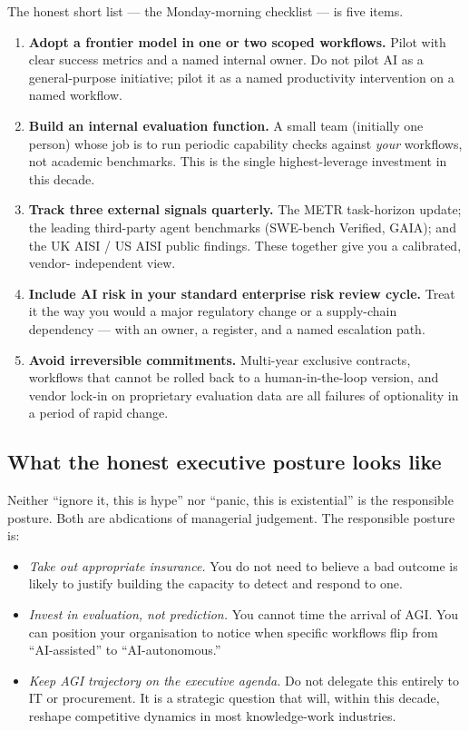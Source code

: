 \documentclass[11pt,a4paper]{article}
\begin{document}
The honest short list --- the Monday-morning checklist --- is five
items.

\begin{enumerate}[leftmargin=1.4em]
  \item \textbf{Adopt a frontier model in one or two scoped workflows.}
        Pilot with clear success metrics and a named internal owner.
        Do not pilot AI as a general-purpose initiative; pilot it as
        a named productivity intervention on a named workflow.
  \item \textbf{Build an internal evaluation function.} A small team
        (initially one person) whose job is to run periodic capability
        checks against \emph{your} workflows, not academic benchmarks.
        This is the single highest-leverage investment in this
        decade.
  \item \textbf{Track three external signals quarterly.} The METR
        task-horizon update; the leading third-party agent benchmarks
        (SWE-bench Verified, GAIA); and the UK AISI / US AISI public
        findings. These together give you a calibrated, vendor-
        independent view.
  \item \textbf{Include AI risk in your standard enterprise risk
        review cycle.} Treat it the way you would a major regulatory
        change or a supply-chain dependency --- with an owner, a
        register, and a named escalation path.
  \item \textbf{Avoid irreversible commitments.} Multi-year exclusive
        contracts, workflows that cannot be rolled back to a
        human-in-the-loop version, and vendor lock-in on proprietary
        evaluation data are all failures of optionality in a period of
        rapid change.
\end{enumerate}

\subsection{What the honest executive posture looks like}

Neither ``ignore it, this is hype'' nor ``panic, this is existential''
is the responsible posture. Both are abdications of managerial
judgement. The responsible posture is:

\begin{itemize}[leftmargin=1.4em]
  \item \emph{Take out appropriate insurance.} You do not need to
        believe a bad outcome is likely to justify building the
        capacity to detect and respond to one.
  \item \emph{Invest in evaluation, not prediction.} You cannot time
        the arrival of AGI. You can position your organisation to
        notice when specific workflows flip from ``AI-assisted'' to
        ``AI-autonomous.''
  \item \emph{Keep AGI trajectory on the executive agenda.} Do not
        delegate this entirely to IT or procurement. It is a
        strategic question that will, within this decade, reshape
        competitive dynamics in most knowledge-work industries.
\end{itemize}
\end{document}
